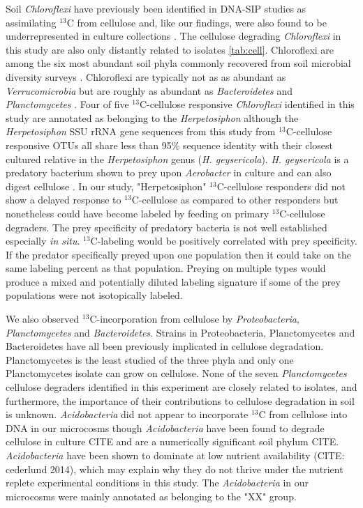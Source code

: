 Soil \textit{Chloroflexi} have previously been identified in DNA-SIP studies as assimilating $^{13}$C from cellulose and, like our findings, were also found to be underrepresented in culture collections \citep{Schellenberger_2010}. The
cellulose degrading \textit{Chloroflexi} in this study are also
only distantly related to isolates \ref{tab:cell}.  Chloroflexi are among the
six most abundant soil phyla commonly recovered from soil microbial diversity
surveys \citep{Janssen2006}. Chloroflexi are typically not as as abundant as
\textit{Verrucomicrobia} but are roughly as abundant as \textit{Bacteroidetes}
and \textit{Planctomycetes} \citep{Janssen2006}.  Four of five
$^{13}$C-cellulose responsive \textit{Chloroflexi} identified in this study are
annotated as belonging to the \textit{Herpetosiphon} although the
\textit{Herpetosiphon} SSU rRNA gene sequences from this study from 
$^{13}$C-cellulose responsive OTUs all share less
than 95\% sequence identity with their
closest cultured relative in the \textit{Herpetosiphon} genus (\textit{H.
    geysericola}). \textit{H. geysericola} is a predatory bacterium shown to
prey upon \textit{Aerobacter} in culture and can also digest cellulose
\citep{Lewin1970}. In our study, "Herpetosiphon" $^{13}$C-cellulose responders
did not show a delayed response to $^{13}$C-cellulose as compared to other
responders but nonetheless could have
become labeled by feeding on primary $^{13}$C-cellulose degraders. The prey
specificity of predatory bacteria is not well established especially \textit{in
    situ}. $^{13}$C-labeling would be positively correlated with prey
specificity. If the predator specifically preyed upon one population then it
could take on the same labeling percent as that population. Preying on multiple
types would produce a mixed and potentially diluted labeling signature if some
of the prey populations were not isotopically labeled.

We also observed $^{13}$C-incorporation from cellulose by
\textit{Proteobacteria}, \textit{Planctomycetes} and \textit{Bacteroidetes}. 
Strains in Proteobacteria, Planctomycetes and Bacteroidetes have all been
previously implicated in cellulose degradation. Planctomycetes is the
least studied of the three phyla and only one Planctomycetes isolate can
grow on cellulose. None of the seven \textit{Planctomycetes} cellulose degraders
identified in this experiment are closely related to isolates, and furthermore, the importance of their contributions to cellulose
degradation in soil is unknown. \textit{Acidobacteria} did not appear to incorporate $^{13}$C from
cellulose into DNA in our microcosms though \textit{Acidobacteria} have been
found to degrade cellulose in culture CITE and are a numerically significant
soil phylum CITE. \textit{Acidobacteria} have been shown to dominate at low nutrient availability (CITE: cederlund 2014), which may explain why they do not thrive under the nutrient replete experimental conditions in this study. The \textit{Acidobacteria} in our microcosms were mainly
annotated as belonging to the "XX" group. 

